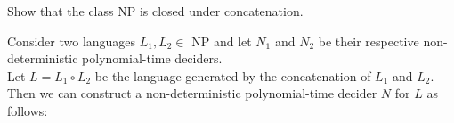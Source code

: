 \documentclass[addpoints,a4paper]{exam}
\begin{document}
\begin{questions}
\begin{solution}
\begin{parts}
    \end{parts}
  \end{solution}


  \question[20] Show that the class NP is closed under concatenation.
  \begin{solution}


    Consider two languages $L_1, L_2 \in$ NP and let $N_1$ and $N_2$ be their respective non-deterministic polynomial-time deciders. \\ Let $ L = L_1 \circ L_2 $ be the language generated by the concatenation of $L_1$ and $L_2$. Then we can construct a non-deterministic polynomial-time decider $N$ for $L$ as follows:


\end{solution}
\end{questions}
\end{document}
